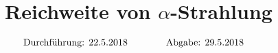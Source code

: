 

\subject{V701}
\title{Reichweite von \texorpdfstring{$\alpha$}{alpha}-Strahlung}

\date{
  \begin{align}
    \text{Durchführung: } & \text{22.5.2018} & \hspace{3em} & \text{Abgabe: 29.5.2018} \notag
  \end{align}
}




\maketitle
\thispagestyle{empty}
\tableofcontents
\newpage






\nocite{*}
\printbibliography{}


